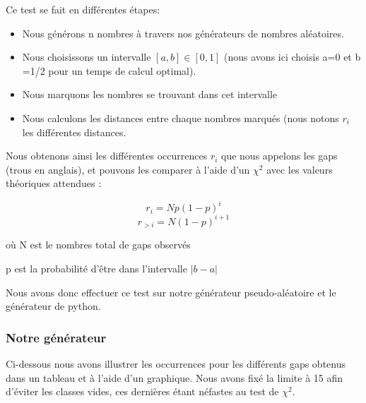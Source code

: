 \documentclass[10pt,a4paper]{article}
\begin{document}
Ce test se fait en différentes étapes:
\begin{itemize}
\item Nous générons n nombres à travers nos générateurs de nombres aléatoires.
\item Nous choisissons un intervalle $[a,b]\in[0,1]$ (nous avons ici choisis a=0 et b =1/2 pour un temps de calcul optimal).
\item Nous marquons les nombres se trouvant dans cet intervalle
\item Nous calculons les distances entre chaque nombres marqués (nous notons $r_i$ les différentes distances. 
\end{itemize} 

Nous obtenons ainsi les différentes occurrences $r_i$ que nous appelons les gaps (trous en anglais), et pouvons les comparer à l'aide d'un $\chi^2$ avec les valeurs théoriques attendues :

\[
	r_i = N p (1-p)^i
\] 
\[
	r_{>i} = N (1-p)^{i+1}
\]

où N est le nombres total de gaps observés

p est la probabilité d'être dans l'intervalle $|b-a|$


Nous avons donc effectuer ce test sur notre générateur pseudo-aléatoire et le générateur de python.

	\subsubsection{Notre générateur}

Ci-dessous nous avons illustrer les occurrences pour les différents gaps obtenus dans un tableau et à l'aide d'un graphique. 
Nous avons fixé la limite à 15 afin d'éviter les classes vides, ces dernières étant néfastes au test de $\chi^2$.
\end{document}
